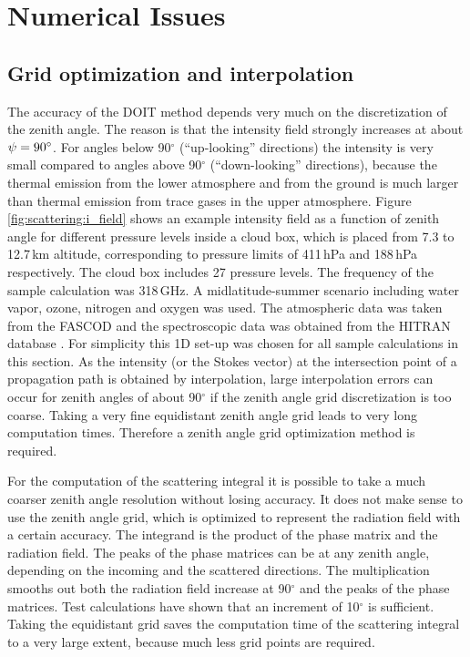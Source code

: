 \section{Numerical Issues}
\label{sec:scattering:implementation_DOIT}


\subsection{Grid optimization and interpolation}
\label{sec:scattering:grid_opt_interp}

The accuracy of the DOIT method depends very much on the
discretization of the zenith angle. The reason is that the intensity
field strongly increases at about $\psi=90^\circ$. For angles
below 90$^\circ$ (``up-looking'' directions) the intensity is very
small compared to angles above 90$^\circ$ (``down-looking''
directions), because the thermal emission from the lower atmosphere
and from the ground is much larger than thermal emission from trace
gases in the upper atmosphere. Figure \ref{fig:scattering:i_field} shows an
example intensity field as a function of zenith angle for different
pressure levels inside a cloud box, which is placed from 7.3 to 12.7\,km
altitude, corresponding to pressure limits of 411\,hPa and 188\,hPa
respectively. The cloud box includes 27 pressure levels. The frequency
of the sample calculation was 318\,GHz. A midlatitude-summer scenario
including water vapor, ozone, nitrogen and oxygen was used.
The atmospheric data was taken from the FASCOD \citep{anderson:86}
and the spectroscopic data was obtained from the HITRAN database
\citep{rothman:98}. For simplicity 
this 1D set-up was chosen for all sample calculations in this section.  As the
intensity (or the Stokes vector) at the intersection point of a
propagation path is obtained by interpolation, large interpolation
errors can occur for zenith angles of about 90$^\circ$ if the zenith
angle grid discretization is too coarse.  Taking a very fine
equidistant zenith angle grid leads to very long computation times.
Therefore a zenith angle grid optimization method is required.

For the computation of the scattering integral it is possible to take
a much coarser zenith angle resolution without losing accuracy.  It
does not make sense to use the zenith angle grid, which is optimized
to represent the radiation field with a certain accuracy. The
integrand is the product of the phase matrix and the radiation field.
The peaks of the phase matrices can be at any zenith angle, depending
on the incoming and the scattered directions. The multiplication
smooths out both the radiation field increase at 90$^\circ$ and the
peaks of the phase matrices.  Test calculations have shown that an
increment of 10$^\circ$ is sufficient. Taking the equidistant grid
saves the computation time of the scattering integral to a very large
extent, because much less grid points are required.

